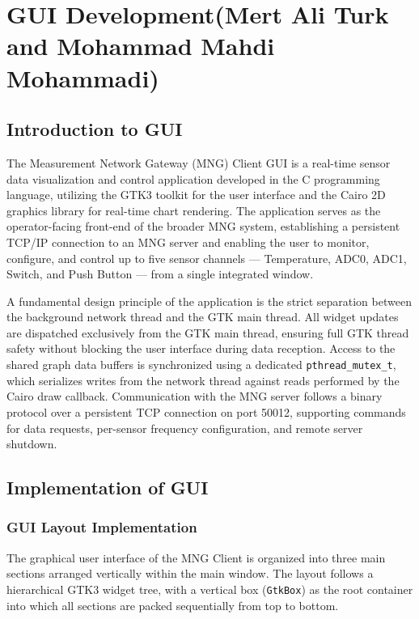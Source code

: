 \section{GUI Development(Mert Ali Turk and Mohammad Mahdi Mohammadi)}

\subsection{Introduction to GUI}
\label{subsection:intro}

The Measurement Network Gateway (MNG) Client GUI is a real-time sensor
data visualization and control application developed in the C programming
language, utilizing the GTK3 toolkit for the user interface and the Cairo
2D graphics library for real-time chart rendering. The application serves
as the operator-facing front-end of the broader MNG system, establishing
a persistent TCP/IP connection to an MNG server and enabling the user to
monitor, configure, and control up to five sensor channels ---
Temperature, ADC0, ADC1, Switch, and Push Button --- from a single
integrated window.

A fundamental design principle of the application is the strict
separation between the background network thread and the GTK main thread.
All widget updates are dispatched exclusively from the GTK main thread,
ensuring full GTK thread safety without blocking the user interface during
data reception. Access to the shared graph data buffers is synchronized
using a dedicated \texttt{pthread\_mutex\_t}, which serializes writes from
the network thread against reads performed by the Cairo draw callback.
Communication with the MNG server follows a binary protocol over a
persistent TCP connection on port 50012, supporting commands for data
requests, per-sensor frequency configuration, and remote server shutdown.


\subsection{Implementation of GUI}
\subsubsection{GUI Layout Implementation}

The graphical user interface of the MNG Client is organized into three
main sections arranged vertically within the main window. The layout
follows a hierarchical GTK3 widget tree, with a vertical box
(\texttt{GtkBox}) as the root container into which all sections are
packed sequentially from top to bottom.

